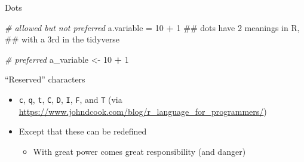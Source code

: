 \documentclass[ignorenonframetext,]{beamer}
\newenvironment{Shaded}{\begin{snugshade}}{\end{snugshade}}
\newcommand{\CommentTok}[1]{\textcolor[rgb]{0.56,0.35,0.01}{\textit{#1}}}
\newcommand{\DecValTok}[1]{\textcolor[rgb]{0.00,0.00,0.81}{#1}}
\newcommand{\NormalTok}[1]{#1}
\newcommand{\OperatorTok}[1]{\textcolor[rgb]{0.81,0.36,0.00}{\textbf{#1}}}
\newcommand{\StringTok}[1]{\textcolor[rgb]{0.31,0.60,0.02}{#1}}
\providecommand{\tightlist}{%
  \setlength{\itemsep}{0pt}\setlength{\parskip}{0pt}}
\begin{document}
\begin{frame}[fragile]{Dots}
\protect\hypertarget{dots}{}

\begin{Shaded}
\begin{Highlighting}[]
\CommentTok{# allowed but not preferred}
\NormalTok{a.variable =}\StringTok{ }\DecValTok{10} \OperatorTok{+}\StringTok{ }\DecValTok{1}
\NormalTok{  ## dots have 2 meanings in R, }
\NormalTok{    ## with a 3rd in the tidyverse}

\CommentTok{# preferred}
\NormalTok{a_variable <-}\StringTok{ }\DecValTok{10} \OperatorTok{+}\StringTok{ }\DecValTok{1}
\end{Highlighting}
\end{Shaded}

\end{frame}

\begin{frame}[fragile]{``Reserved'' characters}
\protect\hypertarget{reserved-characters}{}

\begin{itemize}
\tightlist
\item
  \texttt{c}, \texttt{q}, \texttt{t}, \texttt{C}, \texttt{D},
  \texttt{I}, \texttt{F}, and \texttt{T} (via
  \url{https://www.johndcook.com/blog/r_language_for_programmers/})
\item
  Except that these can be redefined

  \begin{itemize}
  \tightlist
  \item
    With great power comes great responsibility (and danger)
  \end{itemize}
\end{itemize}

\end{frame}
\end{document}
